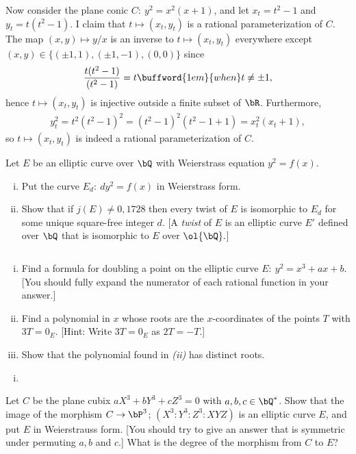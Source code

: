 \begin{homework}[e]
\begin{prf}
		Now consider the plane conic $C: ~ y^2 = x^2(x+1)$, and let $x_t = t^2 - 1$ and $y_t = t(t^2 - 1)$. I claim that $t \mapsto (x_t,y_t)$ is a rational parameterization of $C$. The map $(x,y) \mapsto y/x$ is an inverse to $t\mapsto (x_t,y_t)$ everywhere except $(x,y) \in \{(\pm 1, 1), (\pm 1, -1), (0,0)\}$ since
		\begin{align*}
			\frac{t(t^2 - 1)}{(t^2 - 1)} = t \buffword{1em}{when} t \neq \pm 1,
		\end{align*}
		hence $t \mapsto (x_t,y_t)$ is injective outside a finite subset of $\bR$. Furthermore,
		\begin{align*}
			y_t^2 = t^2(t^2 - 1)^2 = (t^2-1)^2(t^2 - 1 + 1) = x_t^2(x_t + 1),
		\end{align*}
		so $t \mapsto (x_t, y_t)$ is indeed a rational parameterization of $C$.
	\end{prf}

	 Let $E$ be an elliptic curve over $\bQ$ with Weierstrass equation $y^2 = f(x)$.
	\begin{enumerate}[(i)]
		\item Put the curve $E_d: ~ dy^2 = f(x)$ in Weierstrass form.
		\item Show that if $j(E) \neq 0, 1728$ then every twist of $E$ is isomorphic to $E_d$ for some unique square-free integer $d$. [A \emph{twist} of $E$ is an elliptic curve $E'$ defined over $\bQ$ that is isomorphic to $E$ over $\ol{\bQ}.$]
	\end{enumerate}

	$ $
	\begin{enumerate}[(i)]
		\item Find a formula for doubling a point on the elliptic curve $E:~y^2 = x^3 + ax + b.$ [You should fully expand the numerator of each rational function in your answer.]
		\item Find a polynomial in $x$ whose roots are the $x$-coordinates of the points $T$ with $3T = 0_E$. [Hint: Write $3T = 0_E$ as $2T = -T$.]
		\item Show that the polynomial found in \emph{(ii)} has distinct roots.
	\end{enumerate}
	\begin{prf}
		\begin{enumerate}[(i)]
			\item 
		\end{enumerate}
	\end{prf}
    
	 Let $C$ be the plane cubix $aX^3 + bY^3 + cZ^3 = 0$ with $a,b,c \in \bQ^*$. Show that the image of the morphism $C \to \bP^3$; $(X^3: Y^3 : Z^3 : XYZ)$ is an elliptic curve $E$, and put  $E$ in Weierstrauss form. [You should try to give an answer that is symmetric under permuting $a,b$ and $c$.] What is the degree of the morphism from $C$ to $E$?
\end{homework}


